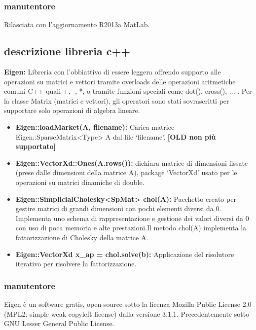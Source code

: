 \documentclass[12pt]{article}
\begin{document}
		\subsubsection{manutentore}
		
			Rilasciata con l'aggiornamento R2013a MatLab.
		
	\subsection{descrizione libreria c++}
	
		\large{\textbf{Eigen:}} Libreria con l'obbiattivo di essere leggera offrendo supporto alle operazioni su matrici e vettori tramite overloads delle operazioni aritmetiche comuni C++ quali +, -, *, o tramite funzioni speciali come dot(), cross(), ... . \newline
		Per la classe Matrix (matrici e vettori), gli operatori sono stati sovrascritti per supportare solo operazioni di algebra lineare.\newline
		
		\begin{itemize}
			\item \textbf{Eigen::loadMarket(A, filename):} Carica matrice Eigen::SparseMatrix<Type> A dal file `filename'. \textbf{[OLD non più supportato]}
			\item \textbf{Eigen::VectorXd::Ones(A.rows()):} dichiara matrice di dimensioni fissate (prese dalle dimensioni della matrice A), package `VectorXd' usato per le operazioni su matrici dinamiche di double.
			\item \textbf{Eigen::SimplicialCholesky<SpMat> chol(A):} Pacchetto creato per gestire matrici di grandi dimensioni con pochi elementi diversi da 0. Implementa uno schema di rappresentazione e gestione dei valori diversi da 0 con uso di poca memoria e alte prestazioni.\newline Il metodo chol(A) implementa la fattorizzazione di Cholesky della matrice A.
   			\item \textbf{Eigen::VectorXd x\_ap = chol.solve(b):} Applicazione del risolutore iterativo per risolvere la fattorizzazione.
		\end{itemize}
		\subsubsection{manutentore}
			Eigen è un software gratis, open-source sotto la licenza Mozilla Public License 2.0 (MPL2:  simple weak copyleft license) dalla versione 3.1.1. \newline Precedentemente sotto GNU Lesser General Public License. 
			
\end{document}
